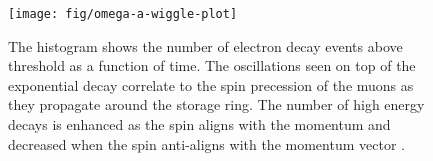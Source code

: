 \begin{figure}
\label{fig:omega-a-wiggle-plot}
\texttt{[image: fig/omega-a-wiggle-plot]}
\caption{The histogram shows the number of electron decay events above threshold as a function of time.  The oscillations seen on top of the exponential decay correlate to the spin precession of the muons as they propagate around the storage ring.  The number of high energy decays is enhanced as the spin aligns with the momentum and decreased when the spin anti-aligns with the momentum vector .}
\end{figure}

